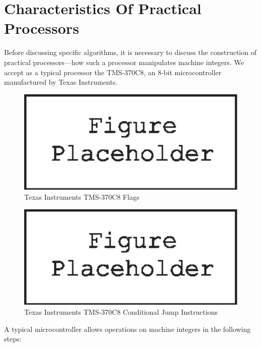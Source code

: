 \section{Characteristics Of Practical Processors}
\label{ccil0:scpp0}

Before discussing specific algorithms, it is necessary to 
discuss the construction of practical processors---how such a processor
manipulates machine integers.  We accept as a typical processor the
TMS-370C8, an 8-bit microcontroller manufactured by 
Texas Instruments.

\begin{figure}
\centering
\includegraphics[width=4.6in]{c_cil0/t370flag.eps}
\caption{Texas Instruments TMS-370C8 Flags}
\label{fig:ccil0:scpp0:00}
\end{figure}

\begin{figure}
\centering
\includegraphics[width=4.6in]{c_cil0/t370cjmp.eps}
\caption{Texas Instruments TMS-370C8 Conditional Jump Instructions}
\label{fig:ccil0:scpp0:01}
\end{figure}

A typical microcontroller allows operations on machine integers
in the following steps:

